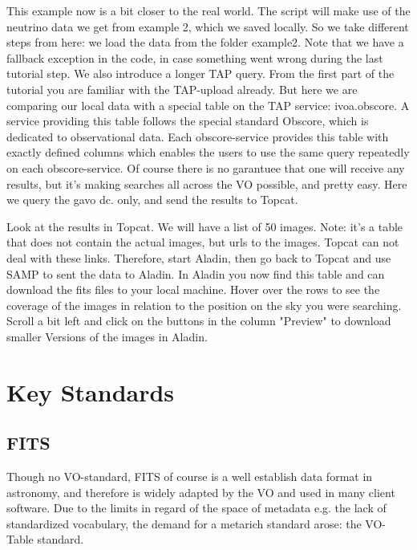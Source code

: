 \documentclass[twoside]{article}[12pt]
\begin{document}
\SAMP


This example now is a bit closer to the real world. The script will make use
of the neutrino data we get from example 2, which we saved locally. So we take different steps from here: we load the data
from the folder example2. Note that we have a fallback exception in the
code, in case something went wrong during the last tutorial step. We
also introduce a longer TAP query. From the first part of the tutorial
you are familiar with the TAP-upload already. But here we are comparing
our local data with a special table on the TAP service: ivoa.obscore. 
A service providing this table follows the special standard Obscore,
which is dedicated to observational data. Each obscore-service provides
this table with exactly defined columns which enables the users to use
the same query repeatedly on each obscore-service. Of course there is no
garantuee that one will receive any results, but it's making searches
all across the VO possible, and pretty easy. Here we query the gavo
dc. only, and send the results to Topcat. 

\OBSCORE


Look at the results in Topcat. We will have a list of 50 images. Note:
it's a table that does not contain the actual images, but urls to the
images. Topcat can not deal with these links. Therefore, start Aladin,
then go back to Topcat and use SAMP to sent the data to Aladin. 
In Aladin you now find this table and can download the fits files to
your local machine. Hover over the rows to see the coverage of the
images in relation to the position on the sky you were searching. 
Scroll a bit left and click on the buttons in the column "Preview" to
download smaller Versions of the images in Aladin. 

\section{Key Standards}

\subsection*{FITS}

Though no VO-standard, FITS of course is a well establish data format in
astronomy, and therefore is widely adapted by the VO and used in many
client software. Due to the limits in regard of the space of metadata
e.g. the lack of standardized vocabulary, the demand for a metarich
standard arose: the VO-Table standard.
\end{document}

